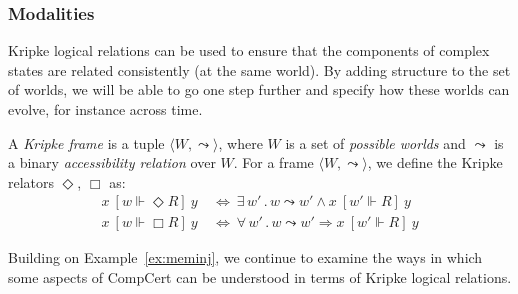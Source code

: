 \documentclass[acmsmall,timestamp,review,anonymous]{acmart}
\newcommand{\ifr}[1]{\ [{#1}]\ }
\begin{document}
\subsubsection{Modalities}

Kripke logical relations
can be used to ensure that the components of complex states
are related consistently (at the same world).
By adding structure to the set of worlds,
we will be able to go one step further and
specify how these worlds can evolve,
for instance across time.

\begin{definition} %
A \emph{Kripke frame} is a tuple
$\langle W, {\leadsto} \rangle$, where
$W$ is a set of \emph{possible worlds} and
$\leadsto$ is a
binary \emph{accessibility relation} over $W$.
For a frame
$\langle W, \leadsto \rangle$,
we define the Kripke relators $\Diamond$, $\Box$ as:
\begin{align*}
  x \ifr{w \Vdash \Diamond R} y & \: \Leftrightarrow \:
    \exists \, w' \,.\, w \leadsto w' \wedge
      x \ifr{w' \Vdash R} y \\
  x \ifr{w \Vdash \Box R} y & \: \Leftrightarrow \:
    \forall \, w' \,.\, w \leadsto w' \Rightarrow
      x \ifr{w' \Vdash R} y
\end{align*}
\end{definition}

Building on Example~\ref{ex:meminj},
we continue to examine the ways in which
some aspects of CompCert can be understood
in terms of Kripke logical relations.
\end{document}
